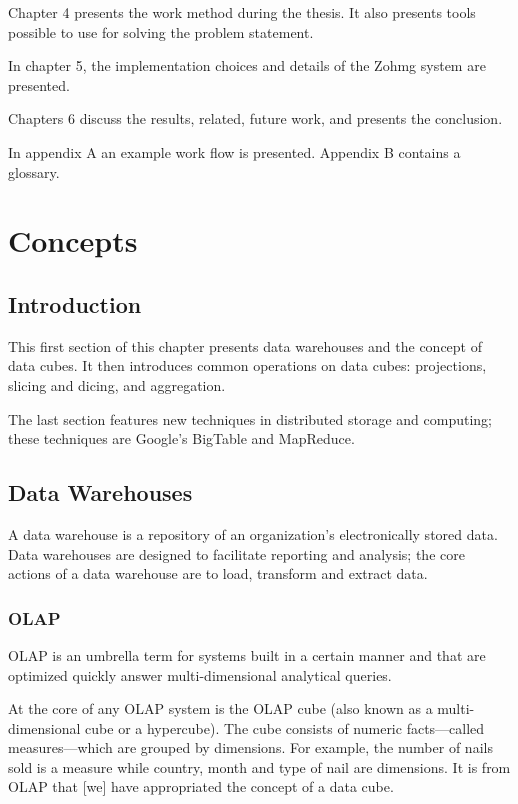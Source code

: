 Chapter 4 presents the work method during the thesis. It also presents tools
possible to use for solving the problem statement.

In chapter 5, the implementation choices and details of the Zohmg system are
presented.

Chapters 6 discuss the results, related, future work, and presents the
conclusion.

In appendix A an example work flow is presented. Appendix B contains a glossary.


\chapter{Concepts}



\section*{Introduction}

This first section of this chapter presents data warehouses and the concept of
data cubes. It then introduces common operations on data cubes: projections,
slicing and dicing, and aggregation.

The last section features new techniques in distributed storage and computing;
these techniques are Google's BigTable and MapReduce.


\section{Data Warehouses}

A data warehouse is a repository of an organization's electronically stored
data. Data warehouses are designed to facilitate reporting and analysis; the
core actions of a data warehouse are to load, transform and extract data.


\subsection*{OLAP}

OLAP is an umbrella term for systems built in a certain manner and that are
optimized quickly answer multi-dimensional analytical queries.

At the core of any OLAP system is the OLAP cube (also known as a
multi-dimensional cube or a hypercube). The cube consists of numeric
facts---called measures---which are grouped by dimensions. For example, the
number of nails sold is a measure while country, month and type of nail are
dimensions. It is from OLAP that [we] have appropriated the concept of a data
cube.

